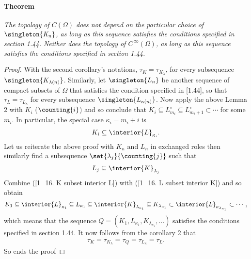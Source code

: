 \paragraph{Theorem}{\it 
The topology of %
%
$\mathit{C(\Omega)}$ %
%
does not depend on the particular choice of %
%
$\mathit{\singleton{K_n}}$, %
%
as long as this sequence satisfies the conditions specified in section 1.44. %
Neither does the topology of %
%
$\mathit{C^{\,\infty} (\Omega)}$, %
%
as long as this sequence satisfies the conditions specified in section 1.44.
}
%
\begin{proof}%
With the second corollary's notations,
% 
  $\tau_{K} = \tau_{K_\lambda}$,
%
for every subsequence $\singleton{K_{\lambda(n)}}$.
% 
Similarly, let 
%
  $\singleton{L_n}$ 
% 
be another sequence of compact subsets of $\Omega$ that satisfies 
the condition specified in [1.44], 
so that 
%
  $\tau_{L} = \tau_{L_\kappa}$
%
for every subsequence $\singleton{L_{\kappa(n)}}$. 
%
Now apply the above Lemma 2 with $K_i$ ($\counting{i}$) and so conclude that  
%
  $K_i 
    \subseteq 
  L^\circ_{m_i} 
    \subseteq 
  L^\circ_{m_{i}+1}
    \subset
  \cdots$
%  
for some $m_i$. In particular, the special case $\kappa_i = m_i + i$ is 
%
  \begin{align}
    \label{1_16. K subset interior L}
    K_i
      \subseteq 
    \interior{L}_{\kappa_i}.
  \end{align} 
%
Let us reiterate the above proof with $K_n$ and $L_n$ in exchanged roles 
then similarly find a subsequence $\set{\lambda_j}{\counting{j}}$ such that 
%
  \begin{align}
  \label{1_16. L subset interior K}
    L_j \subseteq \interior{K}_{\lambda_j}
  \end{align}
%
Combine 
%
  (\ref{1_16. K subset interior L}) with 
  (\ref{1_16. L subset interior K}) 
%
and so obtain
%
  \begin{align}
    K_1 
      \subseteq 
    \interior{L}_{\kappa_1} 
      \subseteq 
    L_{\kappa_1} 
      \subseteq 
    \interior{K}_{\lambda_{\kappa_1}}
      \subseteq 
    K_{\lambda_{\kappa_1}}
      \subset
    \interior{L}_{\kappa_{\lambda_{\kappa_1}}}
      \subset
    \cdots, 
  \end{align}
%
which means that the sequence 
%
  $Q = (
    K_1, 
    L_{\kappa_1}, 
    K_{\lambda_{\kappa_1}}, 
    \dots
  )$
%
satisfies the conditions specified in section 1.44. 
It now follows from the corollary 2 that 
%
  \begin{align}  
    \tau_{K} 
    = 
      \tau_{K_\lambda} 
    = 
      \tau_{Q} 
    = 
      \tau_{L_\kappa} 
    = \tau_{L}.
  \end{align} 
%
So ends the proof
\end{proof}
